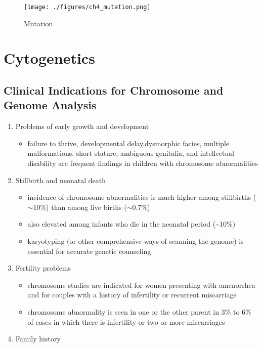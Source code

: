 \documentclass[12pt]{scrartcl}
\begin{document}
\begin{figure}[htbp]
\centering
\texttt{[image: ./figures/ch4\_mutation.png]}
\caption{\label{fig:org3ff7f2c}Mutation}
\end{figure}

\section{Cytogenetics}
\label{sec:org02b1c52}
\subsection{Clinical Indications for Chromosome and Genome Analysis}
\label{sec:org06d50dc}
\begin{enumerate}
\item Problems of early growth and development
\label{sec:org32cde68}
\begin{itemize}
\item failure to thrive, developmental delay,dysmorphic facies, multiple
malformations, short stature, ambiguous genitalia, and
intellectual disability are frequent findings in children with
chromosome abnormalities
\end{itemize}
\item Stillbirth and neonatal death
\label{sec:org4a5bf4d}
\begin{itemize}
\item incidence of chromosome abnormalities is much higher among
stillbirths (\(\sim\)10\%) than among live births (\(\sim\)0.7\%)
\item also elevated among infants who die in the neonatal period (\textasciitilde{}10\%)
\item karyotyping (or other comprehensive ways of scanning the genome) is
essential for accurate genetic counseling
\end{itemize}
\item Fertility problems
\label{sec:org178ee04}
\begin{itemize}
\item chromosome studies are indicated for women presenting with
amenorrhea and for couples with a history of infertility or recurrent miscarriage
\item chromosome abnormality is seen in one or the other parent in 3\% to
6\% of cases in which there is infertility or two or more
miscarriages
\end{itemize}
\item Family history
\label{sec:org657de26}
\begin{itemize}

\end{itemize}
\end{enumerate}
\end{document}
